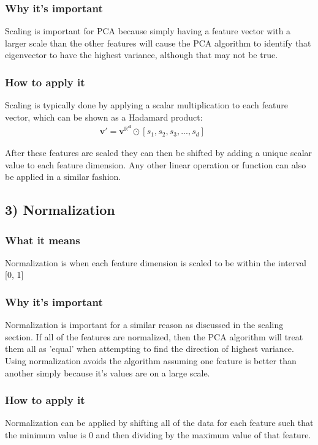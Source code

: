 \documentclass[paper=a4, fontsize=11pt]{scrartcl} %
\numberwithin{equation}{section} %
\numberwithin{figure}{section} %
\numberwithin{table}{section} %
\begin{document}
\subsubsection*{Why it's important}
Scaling is important for PCA because simply having a feature vector with a larger scale than the other features will cause the PCA algorithm to identify that eigenvector to have the highest variance, although that may not be true.

\subsubsection*{How to apply it}
Scaling is typically done by applying a scalar multiplication to each feature vector, which can be shown as a Hadamard product:
\begin{align*}
	\boldsymbol{v'} = \boldsymbol{v^{\mathbb{R}^d}} \odot [s_1, s_2, s_3, ... , s_d]&&
\end{align*}

After these features are scaled they can then be shifted by adding a unique scalar value to each feature dimension. Any other linear operation or function can also be applied in a similar fashion.

\subsection*{3) Normalization}
\subsubsection*{What it means}
Normalization is when each feature dimension is scaled to be within the interval [0, 1]

\subsubsection*{Why it's important}
Normalization is important for a similar reason as discussed in the scaling section. If all of the features are normalized, then the PCA algorithm will treat them all as 'equal' when attempting to find the direction of highest variance. Using normalization avoids the algorithm assuming one feature is better than another simply because it's values are on a large scale.

\subsubsection*{How to apply it}
Normalization can be applied by shifting all of the data for each feature such that the minimum value is 0 and then dividing by the maximum value of that feature.
\end{document}
